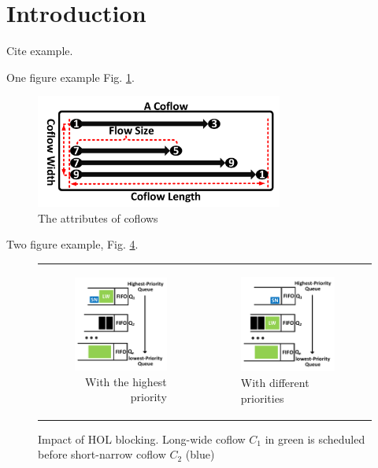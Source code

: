 \section{Introduction}

Cite example\cite{coflow}.

One figure example Fig. \ref{fig:attributes}.

\begin{figure}[h]
    \centering
    \includegraphics[width=3.2in]{./figures/example/attributes}
    \caption{The attributes of coflows}
    \label{fig:attributes}
\end{figure}
Two figure example, Fig. \ref{fig:m1}.
\begin{figure}[h]
  \centering
  \begin{tabular}[c]{@{}r@{}l@{}}
    \begin{subfigure}[t]{1.6in}
        \includegraphics[width=1.6in]{./figures/example//M1a}
        \caption{With the highest priority}\label{fig:m1a}
    \end{subfigure}
    &
    \begin{subfigure}[t]{1.6in}
        \includegraphics[width=1.6in]{./figures/example/M1b}
        \caption{With different priorities}\label{fig:m1b}
    \end{subfigure}
    \\
  \end{tabular}
  \caption{Impact of HOL blocking. Long-wide coflow $C_1$ in green is scheduled before short-narrow coflow $C_2$ (blue) }\label{fig:m1}
\end{figure}


